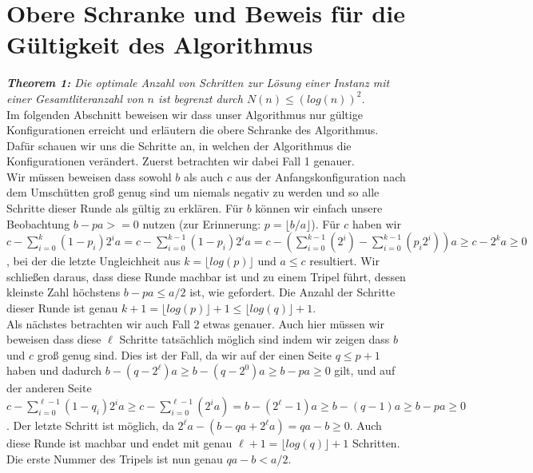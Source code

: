 \chapter{Obere Schranke und Beweis für die Gültigkeit des Algorithmus} 
\textit{\textbf{Theorem 1:} Die optimale Anzahl von Schritten zur Lösung einer Instanz mit einer Gesamtliteranzahl von $n$ ist begrenzt durch $N(n) \leq (log(n))^2$.} \\

Im folgenden Abschnitt beweisen wir dass unser Algorithmus nur gültige Konfigurationen erreicht und erläutern die obere Schranke des Algorithmus. \\

Dafür schauen wir uns die Schritte an, in welchen der Algorithmus die Konfigurationen verändert. Zuerst betrachten wir dabei Fall 1 genauer. \\
Wir müssen beweisen dass sowohl $b$ als auch $c$ aus der Anfangskonfiguration nach dem Umschütten groß genug sind um niemals negativ zu werden und so alle Schritte dieser Runde als gültig zu erklären. Für $b$ können wir einfach unsere Beobachtung $b-pa>=0$ nutzen (zur Erinnerung: $p=\lfloor b/a \rfloor$). 
Für $c$ haben wir $c-\sum_{i=0}^{k} (1-p_i) 2^i a = c-\sum_{i=0}^{k-1} (1-p_i) 2^i a = c-(\sum_{i=0}^{k-1} (2^i) - \sum_{i=0}^{k-1} (p_i 2^i))a \geq c-2^k a \geq 0$, bei der die letzte Ungleichheit aus $k=\lfloor log(p)\rfloor$ und $a \leq c$ resultiert. 
Wir schließen daraus, dass diese Runde machbar ist und zu einem Tripel führt, dessen kleinste Zahl höchstens $b-pa \leq a/2$  ist, wie gefordert. Die Anzahl der Schritte dieser Runde ist genau $k+1 = \lfloor log(p)\rfloor +1\leq \lfloor log(q)\rfloor +1$. \\

Als nächstes betrachten wir auch Fall 2 etwas genauer. Auch hier müssen wir beweisen dass diese $\ell$ Schritte tatsächlich möglich sind indem wir zeigen dass $b$ und $c$ groß genug sind. Dies ist der Fall, da wir auf der einen Seite $q \leq p+1$ haben und dadurch $b-(q-2^\ell)a \geq b-(q-2^0)a \geq b-pa \geq 0$ gilt, 
und auf der anderen Seite $c - \sum_{i=0}^{\ell -1} (1-q_i)2^ia \geq c-\sum_{i=0}^{\ell -1} (2^ia) = b-(2^\ell-1)a \geq b-(q-1)a \geq b-pa \geq 0$. Der letzte Schritt ist möglich, da $2^\ell a-(b-qa+2^\ell a)=qa-b \geq 0$.
Auch diese Runde ist machbar und endet mit genau $\ell+1=\lfloor log(q)\rfloor+1$ Schritten. Die erste Nummer des Tripels ist nun genau $qa-b<a/2$. \\


